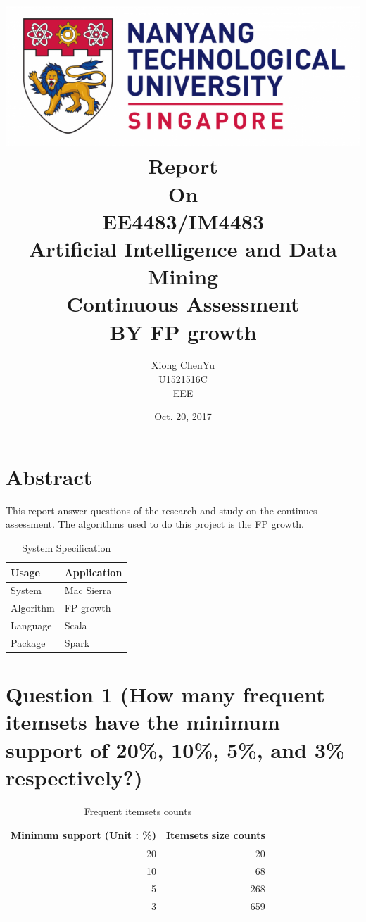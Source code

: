 \documentclass[titlepage]{article}
\author{Xiong ChenYu \\
U1521516C \\
EEE \\
}
\date{Oct. 20, 2017 \\
}
\title{\includegraphics[width=\textwidth]{img/NTU.png} \\
[1\baselineskip] Report \\
On \\
EE4483/IM4483 \\
Artificial Intelligence and Data Mining \\
Continuous Assessment \\
BY FP growth \\
[2\baselineskip]}
\begin{document}
\maketitle
\tableofcontents

\listoftables
\listoffigures

\newpage

\section{Abstract}
\label{sec:org1a1622c}
This report answer questions of the research and study on the continues assessment.
The algorithms used to do this project is the FP growth.

\begin{table}[htbp]
\caption{\label{tab:org01e1fd0}
System Specification}
\centering
\begin{tabular}{ll}
Usage & Application\\
\hline
System & Mac Sierra\\
Algorithm & FP growth\\
Language & Scala\\
Package & Spark\\
\end{tabular}
\end{table}

\newpage

\section{Question 1 (How many frequent itemsets have the minimum support of 20\%, 10\%, 5\%, and 3\% respectively?)}
\label{sec:orge78b22e}

\begin{table}[htbp]
\caption{\label{tab:org1266cfd}
Frequent itemsets counts}
\centering
\begin{tabular}{rr}
Minimum support (Unit : \%) & Itemsets size counts\\
\hline
20 & 20\\
10 & 68\\
5 & 268\\
3 & 659\\
\end{tabular}
\end{table}
\end{document}
